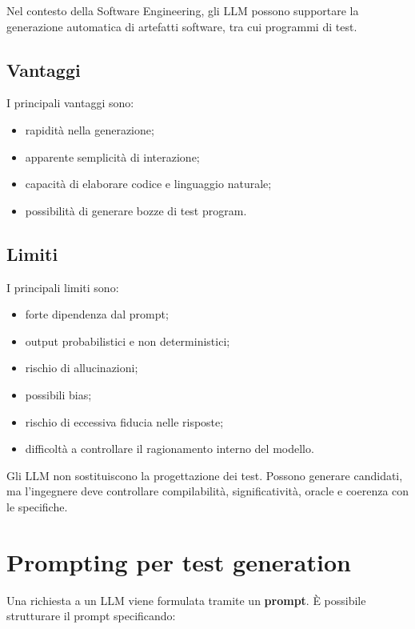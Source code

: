 Nel contesto della Software Engineering, gli LLM possono supportare la generazione automatica di artefatti software, tra cui programmi di test.

\subsection{Vantaggi}

I principali vantaggi sono:

\begin{itemize}
    \item rapidità nella generazione;
    \item apparente semplicità di interazione;
    \item capacità di elaborare codice e linguaggio naturale;
    \item possibilità di generare bozze di test program.
\end{itemize}

\subsection{Limiti}

I principali limiti sono:

\begin{itemize}
    \item forte dipendenza dal prompt;
    \item output probabilistici e non deterministici;
    \item rischio di allucinazioni;
    \item possibili bias;
    \item rischio di eccessiva fiducia nelle risposte;
    \item difficoltà a controllare il ragionamento interno del modello.
\end{itemize}

\begin{notaesame}
Gli LLM non sostituiscono la progettazione dei test. Possono generare candidati, ma l'ingegnere deve controllare compilabilità, significatività, oracle e coerenza con le specifiche.
\end{notaesame}

\section{Prompting per test generation}

Una richiesta a un LLM viene formulata tramite un \textbf{prompt}. È possibile strutturare il prompt specificando:

